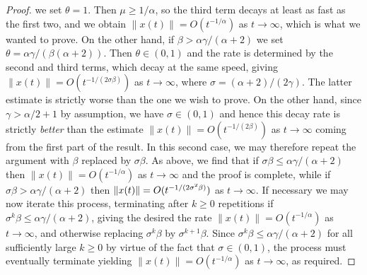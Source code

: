 \documentclass[11pt, a4paper]{amsart}
\theoremstyle{definition}
\numberwithin{equation}{section}
\begin{document}
\begin{proof}
we set $\theta=1$. Then $\mu\ge1/\alpha$, so the third term decays at least as fast as the first two, and we obtain $\|x(t)\|=O(t^{-1/\alpha})$ as $t\to\infty$, which is what we wanted to prove. On the other hand, if $\beta> \alpha\gamma/(\alpha+2)$ we set $\theta=\alpha\gamma/(\beta(\alpha+2))$. Then $\theta\in(0,1)$ and the rate is determined by the second and third terms, which decay at the same speed, giving $\|x(t)\|=O(t^{-1/(2\sigma\beta)})$ as $t\to\infty$, where $\sigma=(\alpha+2)/(2\gamma)$. The latter estimate is strictly worse than the one we wish to prove. On the other hand, since $\gamma>\alpha/2+1$ by assumption, we have $\sigma\in(0,1)$ and hence this decay rate is strictly \emph{better} than the estimate $\|x(t)\|=O(t^{-1/(2\beta)})$ as $t\to\infty$ coming from the first part of the result. In this second case, we may therefore repeat the argument with $\beta$ replaced by $\sigma\beta$. As above, we find that if $\sigma\beta\le \alpha\gamma/(\alpha+2)$ then $\|x(t)\|=O(t^{-1/\alpha})$ as $t\to\infty$ and the proof is complete, while if $\sigma\beta> \alpha\gamma/(\alpha+2)$ then  $\|x(t)\|=O\smash{(t^{-1/(2\sigma^2\beta)})}$ as $t\to\infty$. If necessary we may now iterate this process, terminating after $k\ge0$ repetitions if $\sigma^k\beta\le \alpha\gamma/(\alpha+2)$, giving the desired the rate $\|x(t)\|=O(t^{-1/\alpha})$ as $t\to\infty$, and otherwise replacing $\sigma^k\beta$ by $\sigma^{k+1}\beta$. Since $\sigma^k\beta\le \alpha\gamma/(\alpha+2)$ for all sufficiently large $k\ge0$ by virtue of the fact that $\sigma\in(0,1)$, the process must eventually terminate yielding $\|x(t)\|=O(t^{-1/\alpha})$ as $t\to\infty$, as required.
\end{proof}
\end{document}
